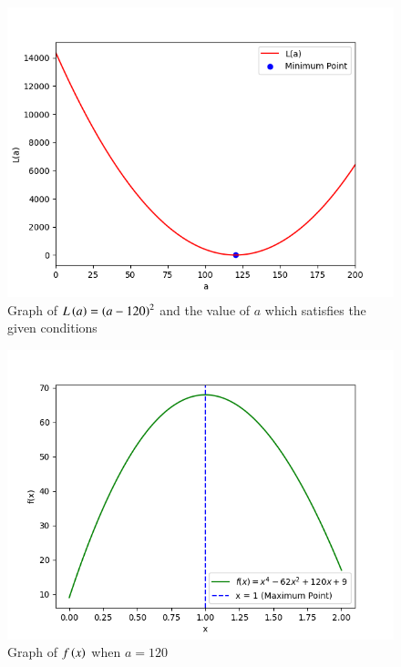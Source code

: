 \documentclass[journal]{IEEEtran}
\begin{document}
\begin{figure}[h!]
   \centering
   \includegraphics[width=\columnwidth]{figs/fig1.png}
   \caption{Graph of $L\left(a\right) = \left(a - 120\right)^2$ and the value of $a$ which satisfies the given conditions}
   \label{stemplot}
\end{figure}

\begin{figure}[h!]
   \centering
   \includegraphics[width=\columnwidth]{figs/fig2.png}
   \caption{Graph of $f\left(x\right)$ when $a = 120$}
   \label{stemplot}
\end{figure}
\end{document}
